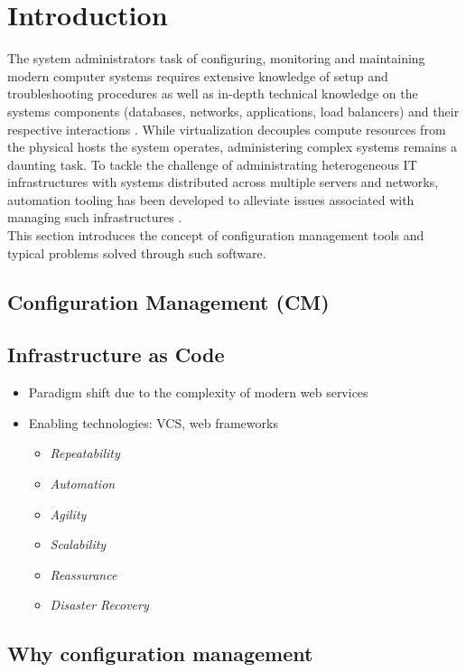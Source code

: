 \section{Introduction}

	The system administrators task of configuring, monitoring and maintaining modern computer systems requires extensive knowledge of setup and troubleshooting procedures as well as in-depth technical knowledge on the systems components (databases, networks, applications, load balancers) and their respective interactions \cite{Barrett:2004:FSC:1031607.1031672}. While virtualization decouples compute resources from the physical hosts the system operates, administering complex systems remains a daunting task. To tackle the challenge of administrating heterogeneous IT infrastructures with systems distributed across multiple servers and networks, automation tooling has been developed to alleviate issues associated with managing such infrastructures \cite{Hintsch2016ARO}. \\ This section introduces the concept of configuration management tools and typical problems solved through such software.

\subsection{Configuration Management (CM)}

\subsection{Infrastructure as Code}

	\begin{itemize}
		\item Paradigm shift due to the complexity of modern web services
		\item Enabling technologies: VCS, web frameworks
			\begin{itemize}
			\item \textit{Repeatability}
			\item \textit{Automation}
			\item \textit{Agility}
			\item \textit{Scalability}
			\item \textit{Reassurance}
			\item \textit{Disaster Recovery}
			\end{itemize}
	\end{itemize}

\subsection{Why configuration management}

